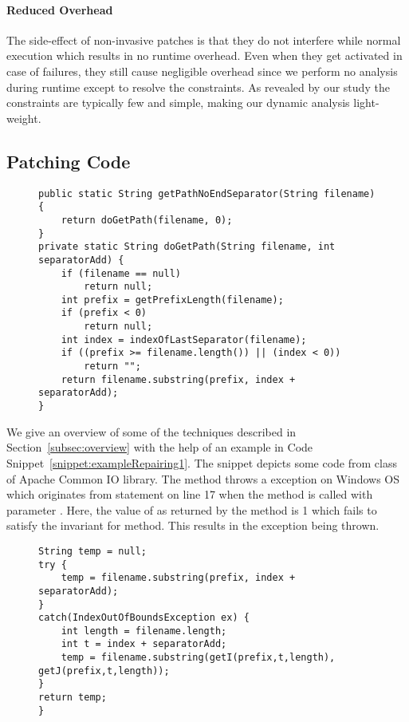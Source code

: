 \paragraph{Reduced Overhead} The side-effect of non-invasive patches is that they do not interfere while
normal execution which results in no runtime overhead. Even when they get activated in case of failures,
they still cause negligible overhead since we perform no analysis during runtime except to resolve the constraints.
As revealed by our study the constraints are typically few and simple, making our dynamic analysis light-weight.


\subsection{Patching Code}
\label{subsec:patchingexample}
	

\begin{figure}[t]
\begin{lstlisting}
public static String getPathNoEndSeparator(String filename) {
	return doGetPath(filename, 0);
}
private static String doGetPath(String filename, int separatorAdd) {
	if (filename == null)
		return null;
	int prefix = getPrefixLength(filename);
	if (prefix < 0)
		return null;
	int index = indexOfLastSeparator(filename);
	if ((prefix >= filename.length()) || (index < 0))
		return "";
	return filename.substring(prefix, index + separatorAdd);
}
\end{lstlisting}
\end{figure}

We give an overview of some of the techniques described in Section~\ref{subsec:overview} with the help of
an example in Code Snippet~\ref{snippet:exampleRepairing1}. The snippet depicts some code
from  class of Apache Common IO library. The method  throws
a  exception on Windows OS which originates from statement 
 on
line 17 when the method is called with parameter .  Here, the value of  as
returned by the method  is 1 which fails to satisfy the invariant
 for  method. This results in the exception being thrown.


\begin{figure}[t]
\begin{lstlisting}
String temp = null;
try {
	temp = filename.substring(prefix, index + separatorAdd);
}
catch(IndexOutOfBoundsException ex) {
	int length = filename.length;
	int t = index + separatorAdd;
	temp = filename.substring(getI(prefix,t,length), getJ(prefix,t,length));
}
return temp;
}
\end{lstlisting}
\end{figure}


